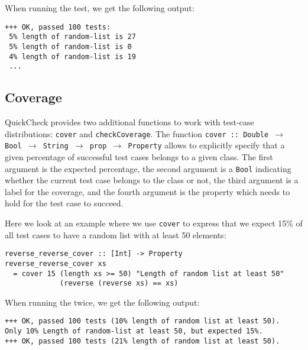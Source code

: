 When running the test, we get the following output:

\begin{footnotesize}
\begin{verbatim}
+++ OK, passed 100 tests:
 5% length of random-list is 27
 5% length of random-list is 0
 4% length of random-list is 19
 ...
\end{verbatim}
\end{footnotesize}

\subsection{Coverage}
QuickCheck provides two additional functions to work with test-case distributions: \texttt{cover} and \texttt{checkCoverage}. The function \texttt{cover :: Double $\rightarrow$ Bool $\rightarrow$ String $\rightarrow$ prop $\rightarrow$ Property} allows to explicitly specify that a given percentage of successful test cases belongs to a given class. The first argument is the expected percentage, the second argument is a \texttt{Bool} indicating whether the current test case belongs to the class or not, the third argument is a label for the coverage, and the fourth argument is the property which needs to hold for the test case to succeed. 

Here we look at an example where we use \texttt{cover} to express that we expect 15\% of all test cases to have a random list with at least 50 elements:

\begin{footnotesize}
\begin{verbatim}
reverse_reverse_cover :: [Int] -> Property
reverse_reverse_cover xs  
  = cover 15 (length xs >= 50) "Length of random list at least 50"
             (reverse (reverse xs) == xs)
\end{verbatim}
\end{footnotesize}

When running the twice, we get the following output:

\begin{footnotesize}
\begin{verbatim}
+++ OK, passed 100 tests (10% length of random list at least 50).
Only 10% Length of random-list at least 50, but expected 15%.
+++ OK, passed 100 tests (21% length of random list at least 50).
\end{verbatim}
\end{footnotesize}

